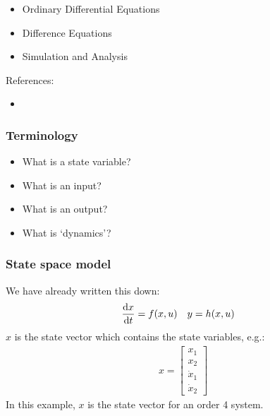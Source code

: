\documentclass[10pt]{beamer-control}
\begin{document}

\begin{SUMMARY}
  \begin{itemize}
    \item Ordinary Differential Equations
    \item Difference Equations
    \item Simulation and Analysis
  \end{itemize}
  \vfill References:
  \begin{itemize}
    \item \astrom[§3.2]
  \end{itemize}
\end{SUMMARY}


\begin{frame}
  \frametitle{Terminology}
  \begin{itemize}
    \item What is a state variable?
    \item What is an input?
    \item What is an output?
    \item What is `dynamics'?
  \end{itemize}
\end{frame}


\begin{frame}
  \frametitle{State space model}
  We have already written this down:
  \begin{align}
    \frac{\mathrm{d} x}{\mathrm{d} t} &= f(x,u) & y &= h(x,u)
  \end{align}
  $x$ is the state vector which contains the state variables, e.g.:
  \begin{align}
    x = \begin{bmatrix} x_1 \\ x_2 \\ \dot x_1 \\ \dot x_2 \end{bmatrix}
  \end{align}
  In this example, $x$ is the state vector for an order 4 system.
\end{frame}
\end{document}
